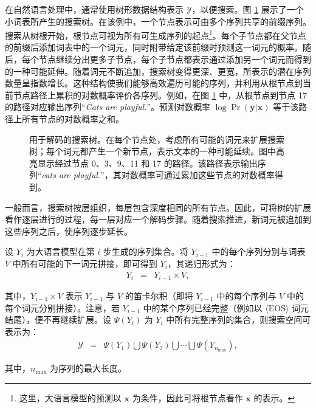 在自然语言处理中，通常使用树形数据结构表示 $\mathcal{Y}$，以便搜索。图 \ref{fig:llm-decoding-search-tree} 展示了一个小词表所产生的搜索树。在该例中，一个节点表示可由多个序列共享的前缀序列。搜索从树根开始，根节点可视为所有可生成序列的起点\footnote{这里，大语言模型的预测以 $\mathbf{x}$ 为条件，因此可将根节点看作 $\mathbf{x}$ 的表示。}。每个子节点都在父节点的前缀后添加词表中的一个词元，同时附带给定该前缀时预测这一词元的概率。随后，每个节点继续分出更多子节点，每个子节点都表示通过添加另一个词元而得到的一种可能延伸。随着词元不断追加，搜索树变得更深、更宽，所表示的潜在序列数量呈指数增长。这种结构使我们能够高效遍历可能的序列，并利用从根节点到当前节点路径上累积的对数概率评价各序列。例如，在图 \ref{fig:llm-decoding-search-tree} 中，从根节点到节点 17 的路径对应输出序列“\textit{Cats are playful.}”。预测对数概率 $\log \Pr(\mathbf{y}|\mathbf{x})$ 等于该路径上所有节点的对数概率之和。

\begin{figure}[!t]
\centering

\vspace{-0.5cm} \caption{用于解码的搜索树。在每个节点处，考虑所有可能的词元来扩展搜索树；每个词元都产生一个新节点，表示文本的一种可能延续。图中高亮显示经过节点 0、3、9、11 和 17 的路径。该路径表示输出序列“\textit{cats are playful.}”，其对数概率可通过累加这些节点的对数概率得到。}
\label{fig:llm-decoding-search-tree}
\end{figure}

一般而言，搜索树按层组织，每层包含深度相同的所有节点。因此，可将树的扩展看作逐层进行的过程，每一层对应一个解码步骤。随着搜索推进，新词元被追加到这些序列之后，使序列逐步延长。

设 $Y_i$ 为大语言模型在第 $i$ 步生成的序列集合。将 $Y_{i-1}$ 中的每个序列分别与词表 $V$ 中所有可能的下一词元拼接，即可得到 $Y_i$，其递归形式为：
\begin{eqnarray}
Y_i & = & Y_{i-1} \times V,
\end{eqnarray}

\noindent 其中，$Y_{i-1} \times V$ 表示 $Y_{i-1}$ 与 $V$ 的笛卡尔积（即将 $Y_{i-1}$ 中的每个序列与 $V$ 中的每个词元分别拼接）。注意，若 $Y_{i-1}$ 中的某个序列已经完整（例如以 $\langle \mathrm{EOS} \rangle$ 词元结尾），便不再继续扩展。设 $\Psi(Y_i)$ 为 $Y_i$ 中所有完整序列的集合，则搜索空间可表示为：
\begin{eqnarray}
\mathcal{Y} & = & \Psi(Y_1) \bigcup \Psi(Y_2) \bigcup \cdots \bigcup \Psi(Y_{n_{\mathrm{max}}}),
\end{eqnarray}

\noindent 其中，$n_{\mathrm{max}}$ 为序列的最大长度。

